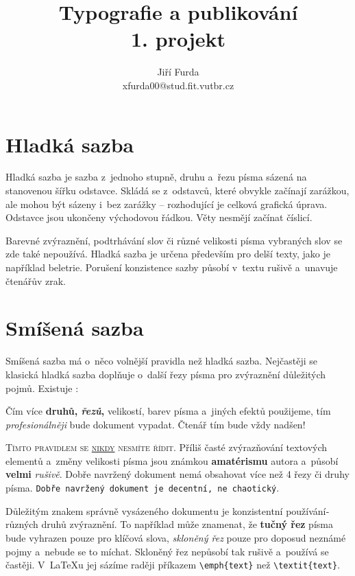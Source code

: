\documentclass[11pt,a4paper,twocolumn]{article}
\title{Typografie a publikování \\ 1. projekt}
\author{Jiří Furda \\ xfurda00@stud.fit.vutbr.cz}
\date{}
\begin{document}
\maketitle

\section{Hladká sazba}

Hladká sazba je sazba z~jednoho stupně, druhu a~řezu pí­sma sázená na stanovenou šířku odstavce. Skládá se z~odstavců, které obvykle začínají­ zarážkou, ale mohou být sázeny i~bez zarážky -- rozhodují­cí­ je celková grafická úprava. Odstavce jsou ukončeny východovou řádkou. Věty nesmějí začínat číslicí.

Barevné zvýraznění­, podtrhávání­ slov či různé velikosti písma vybraných slov se zde také nepoužívá. Hladká sazba je určena především pro delší­ texty, jako je napří­klad beletrie. Porušení­ konzistence sazby působí v~textu rušivě a~unavuje čtenářův zrak.

\section{Smíšená sazba} 

Smíšená sazba má o~něco volnější­ pravidla než hladká sazba. Nejčastěji se klasická hladká sazba doplňuje o~další řezy pí­sma pro zvýraznění­ důležitých pojmů. Existuje :

\vspace{3mm}
\begin{adjustwidth}{8mm}{8mm}
\hspace{6mm}Čí­m ví­ce \textbf{druhů, \emph{řezů},}  {\scriptsize velikostí}, barev pí­sma a~jiných efektů použijeme, tí­m \emph{profesionálněji} bude  dokument vypadat. Čtenář tím bude vždy {\Huge nadšen!}
\end{adjustwidth}
\vspace{3mm}

\textsc{Tí­mto pravidlem se \underline{nikdy} nesmí­te ří­dit.} Příliš časté zvýrazňování textových elementů a~změny velikosti {\tiny pí­sma} jsou {\LARGE známkou} \textbf{\huge a\-ma\-tér\-is\-mu} autora a~působí­ \textbf{velmi} \emph{rušivě}. Dobře na\-vr\-že\-ný dokument nemá obsahovat ví­ce než 4 řezy či druhy pí­sma. \texttt{Dobře navržený dokument je decentní­, ne chaotický}.

Důležitým znakem správně vysázeného dokumentu je konzistentní použí­vání­ různých druhů zvýraznění­. To napří­klad může znamenat, že \textbf{tučný řez} pí­sma bude vyhrazen pouze pro klíčová slova, \emph{skloněný řez} pouze pro doposud neznámé pojmy a~nebude se to míchat. Skloněný řez nepůsobí­ tak rušivě a~použí­vá se častěji. V~{\LaTeX}u jej sází­me raději pří­kazem \verb|\emph{text}| než \verb|\textit{text}|.
\end{document}
